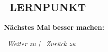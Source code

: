 \subsection*{\faChartLine~LERNPUNKT}
\textbf{Nächstes Mal besser machen:} \\

\vspace{1cm}
\begin{center}
\textit{\textcolor{ctmmPurple}{\faChevronRight~Weiter zu}  | \textcolor{ctmmPurple}{\faChevronLeft~Zurück zu} }
\end{center}
